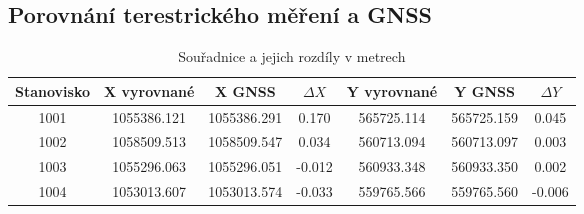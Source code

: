 \subsection{Porovnání terestrického měření a GNSS}

\begin{table}[H]
\centering
\begin{tabular}{|c||c|c|c||c|c|c|}
\hline
Stanovisko & X vyrovnané & X GNSS & $\Delta X$ & Y vyrovnané & Y GNSS & $\Delta Y$ \\
\hline
1001 & 1055386.121 & 1055386.291 & 0.170 & 565725.114 & 565725.159 & 0.045 \\ \hline
1002 & 1058509.513 & 1058509.547 & 0.034 & 560713.094 & 560713.097 & 0.003 \\ \hline
1003 & 1055296.063 & 1055296.051 & -0.012 & 560933.348 & 560933.350 & 0.002 \\ \hline
1004 & 1053013.607 & 1053013.574 & -0.033 & 559765.566 & 559765.560 & -0.006 \\
\hline
\end{tabular}
\caption{Souřadnice a jejich rozdíly v metrech}
\end{table}
